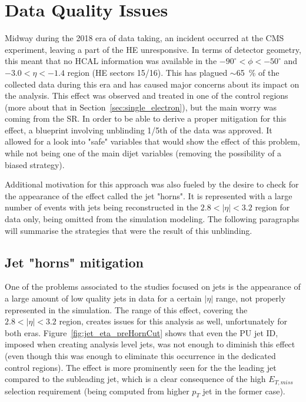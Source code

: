 \section{Data Quality Issues}
\label{sec:data_quality}
\hspace{10pt} Midway during the 2018 era of data taking, an incident occurred at the CMS experiment, leaving a part of the HE unresponsive. In terms of detector geometry, this meant that no HCAL information was available in the $-90^\circ<\phi<-50^\circ$ and $-3.0<\eta<-1.4$ region (HE sectors 15/16). This has plagued $\sim$65~\% of the collected data during this era and has caused major concerns about its impact on the analysis. This effect was observed and treated in one of the control regions (more about that in Section~\ref{sec:single_electron}), but the main worry was coming from the SR. In order to be able to derive a proper mitigation for this effect, a blueprint involving unblinding 1/5th of the data was approved. It allowed for a look into "safe" variables that would show the effect of this problem, while not being one of the main dijet variables (removing the possibility of a biased strategy).

\hspace{10pt} Additional motivation for this approach was also fueled by the desire to check for the appearance of the effect called the jet "horns". It is represented with a large number of events with jets being reconstructed in the $2.8<|\eta|<3.2$ region for data only, being omitted from the simulation modeling. The following paragraphs will summarise the strategies that were the result of this unblinding.

\subsection{Jet "horns" mitigation}
\hspace{10pt} One of the problems associated to the studies focused on jets is the appearance of a large amount of low quality jets in data for a certain $|\eta|$ range, not properly represented in the simulation. The range of this effect, covering the $2.8<|\eta|<3.2$ region, creates issues for this analysis as well, unfortunately for both eras. Figure~\ref{fig:jet_eta_preHornCut} shows that even the PU jet ID, imposed when creating analysis level jets, was not enough to diminish this effect (even though this was enough to eliminate this occurrence in the dedicated control regions). The effect is more prominently seen for the the leading jet compared to the subleading jet, which is a clear consequence of the high $E_{T,miss}$ selection requirement (being computed from higher $p_T$ jet in the former case).


